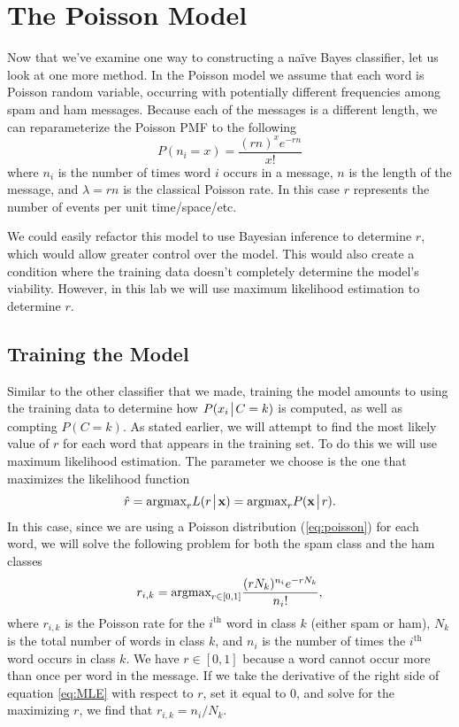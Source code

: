 \section*{The Poisson Model}
Now that we've examine one way to constructing a naïve Bayes classifier, let us look at one more method.
In the Poisson model we assume that each word is Poisson random variable, occurring with potentially different frequencies among spam and ham messages.
Because each of the messages is a different length, we can reparameterize the Poisson PMF to the following
\begin{equation}\label{eq:poisson}
    P(n_i = x) = \frac{(rn)^xe^{-rn}}{x!}
\end{equation}
where $n_i$ is the number of times word $i$ occurs in a message, $n$ is the length of the message, and $\lambda = rn$ is the classical Poisson rate.
In this case $r$ represents the number of events per unit time/space/etc.

We could easily refactor this model to use Bayesian inference to determine $r$, which would allow greater control over the model.
This would also create a condition where the training data doesn't completely determine the model's viability.
However, in this lab we will use maximum likelihood estimation to determine $r$.


\subsection*{Training the Model}
Similar to the other classifier that we made, training the model amounts to using the training data to determine how $P(x_i \!\mathrel{\big|}\! C=k)$ is computed, as well as compting $P(C=k)$.
As stated earlier, we will attempt to find the most likely value of $r$ for each word that appears in the training set.
To do this we will use maximum likelihood estimation.
The parameter we choose is the one that maximizes the likelihood function
\begin{align*}
    \hat{r} = \mbox{argmax}_{r} L(r \!\mathrel{\big|}\! \mathbf{x}) = \mbox{argmax}_{r}P(\mathbf{x} \!\mathrel{\big|}\! r).
\end{align*}
In this case, since we are using a Poisson distribution (\ref{eq:poisson}) for each word, we will solve the following problem for both the spam class and the ham classes
\begin{equation}\label{eq:MLE}
    r_{i,k} = \mbox{argmax}_{r\in[0,1]}\frac{(rN_k)^{n_i}e^{-rN_k}}{n_i!},
\end{equation}
where $r_{i,k}$ is the Poisson rate for the $i^{\text{th}}$ word in class $k$ (either spam or ham), $N_k$ is the total number of words in class $k$, and $n_i$ is the number of times the $i^{\text{th}}$ word occurs in class $k$.
We have $r\in[0,1]$ because a word cannot occur more than once per word in the message.
If we take the derivative of the right side of equation \ref{eq:MLE} with respect to $r$, set it equal to $0$, and solve for the maximizing $r$, we find that $r_{i,k} = n_i / N_k$.


